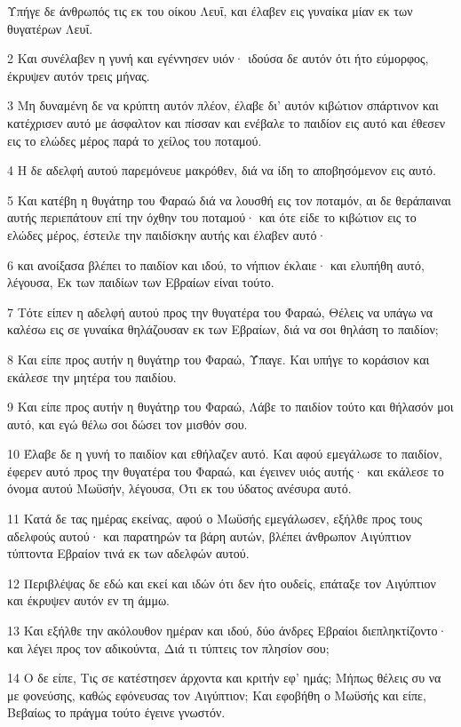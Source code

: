 \par Υπήγε δε άνθρωπός τις εκ του οίκου Λευΐ, και έλαβεν εις γυναίκα μίαν εκ των θυγατέρων Λευΐ.
\par 2 Και συνέλαβεν η γυνή και εγέννησεν υιόν· ιδούσα δε αυτόν ότι ήτο εύμορφος, έκρυψεν αυτόν τρεις μήνας.
\par 3 Μη δυναμένη δε να κρύπτη αυτόν πλέον, έλαβε δι' αυτόν κιβώτιον σπάρτινον και κατέχρισεν αυτό με άσφαλτον και πίσσαν και ενέβαλε το παιδίον εις αυτό και έθεσεν εις το ελώδες μέρος παρά το χείλος του ποταμού.
\par 4 Η δε αδελφή αυτού παρεμόνευε μακρόθεν, διά να ίδη το αποβησόμενον εις αυτό.
\par 5 Και κατέβη η θυγάτηρ του Φαραώ διά να λουσθή εις τον ποταμόν, αι δε θεράπαιναι αυτής περιεπάτουν επί την όχθην του ποταμού· και ότε είδε το κιβώτιον εις το ελώδες μέρος, έστειλε την παιδίσκην αυτής και έλαβεν αυτό·
\par 6 και ανοίξασα βλέπει το παιδίον και ιδού, το νήπιον έκλαιε· και ελυπήθη αυτό, λέγουσα, Εκ των παιδίων των Εβραίων είναι τούτο.
\par 7 Τότε είπεν η αδελφή αυτού προς την θυγατέρα του Φαραώ, Θέλεις να υπάγω να καλέσω εις σε γυναίκα θηλάζουσαν εκ των Εβραίων, διά να σοι θηλάση το παιδίον;
\par 8 Και είπε προς αυτήν η θυγάτηρ του Φαραώ, Ύπαγε. Και υπήγε το κοράσιον και εκάλεσε την μητέρα του παιδίου.
\par 9 Και είπε προς αυτήν η θυγάτηρ του Φαραώ, Λάβε το παιδίον τούτο και θήλασόν μοι αυτό, και εγώ θέλω σοι δώσει τον μισθόν σου.
\par 10 Έλαβε δε η γυνή το παιδίον και εθήλαζεν αυτό. Και αφού εμεγάλωσε το παιδίον, έφερεν αυτό προς την θυγατέρα του Φαραώ, και έγεινεν υιός αυτής· και εκάλεσε το όνομα αυτού Μωϋσήν, λέγουσα, Ότι εκ του ύδατος ανέσυρα αυτό.
\par 11 Κατά δε τας ημέρας εκείνας, αφού ο Μωϋσής εμεγάλωσεν, εξήλθε προς τους αδελφούς αυτού· και παρατηρών τα βάρη αυτών, βλέπει άνθρωπον Αιγύπτιον τύπτοντα Εβραίον τινά εκ των αδελφών αυτού.
\par 12 Περιβλέψας δε εδώ και εκεί και ιδών ότι δεν ήτο ουδείς, επάταξε τον Αιγύπτιον και έκρυψεν αυτόν εν τη άμμω.
\par 13 Και εξήλθε την ακόλουθον ημέραν και ιδού, δύο άνδρες Εβραίοι διεπληκτίζοντο· και λέγει προς τον αδικούντα, Διά τι τύπτεις τον πλησίον σου;
\par 14 Ο δε είπε, Τις σε κατέστησεν άρχοντα και κριτήν εφ' ημάς; Μήπως θέλεις συ να με φονεύσης, καθώς εφόνευσας τον Αιγύπτιον; Και εφοβήθη ο Μωϋσής και είπε, Βεβαίως το πράγμα τούτο έγεινε γνωστόν.
